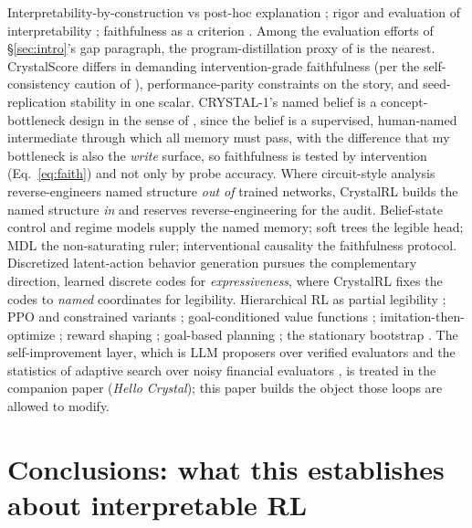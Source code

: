 \documentclass[11pt]{article}
\begin{document}
Interpretability-by-construction vs post-hoc explanation \citep{rudin2019,lipton2018}; rigor
and evaluation of interpretability \citep{doshivelez2017,hoffman2018}; faithfulness as a
criterion \citep{jacovi2020}. Among the evaluation efforts of \S\ref{sec:intro}'s gap
paragraph, the program-distillation proxy of \citet{kohler2025} is the nearest. CrystalScore
differs in demanding intervention-grade faithfulness (per the self-consistency caution of
\citealp{parcalabescu2024}), performance-parity constraints on the story, and seed-replication
stability in one scalar. CRYSTAL-1's named belief is a concept-bottleneck design in the
sense of \citet{koh2020}, since the belief is a supervised, human-named intermediate through which
all memory must pass, with the difference that my bottleneck is also the \emph{write}
surface, so faithfulness is tested by intervention (Eq.~\ref{eq:faith}) and not only by probe
accuracy. Where circuit-style analysis \citep{olah2020} reverse-engineers named structure
\emph{out of} trained networks, CrystalRL builds the named structure \emph{in} and reserves
reverse-engineering for the audit. Belief-state control \citep{kaelbling1998} and regime models
\citep{hamilton1989} supply the named memory; soft trees \citep{frosst2017} the legible head;
MDL \citep{rissanen1978} the non-saturating ruler; interventional causality \citep{pearl2009}
the faithfulness protocol. Discretized latent-action behavior generation \citep{lee2024vqbet}
pursues the complementary direction, learned discrete codes for \emph{expressiveness}, where
CrystalRL fixes the codes to \emph{named} coordinates for legibility. Hierarchical RL as
partial legibility \citep{sutton1999options,bacon2017option}; PPO and constrained variants
\citep{schulman2017ppo,achiam2017}; goal-conditioned value functions \citep{schaul2015};
imitation-then-optimize \citep{ross2011dagger,rusu2016distillation}; reward shaping
\citep{ng1999shaping}; goal-based planning \citep{das2020goals,browne1999}; the stationary
bootstrap \citep{politis1994}. The self-improvement layer, which is LLM proposers over verified
evaluators \citep{romera2024funsearch,novikov2025alphaevolve,ma2023eureka,wang2023voyager} and
the statistics of adaptive search over noisy financial evaluators \citep{baileylopez2014dsr},
is treated in the companion paper (\emph{Hello Crystal}); this paper builds the object
those loops are allowed to modify.

\section{Conclusions: what this establishes about interpretable RL}
\label{sec:conclusions}
\end{document}
